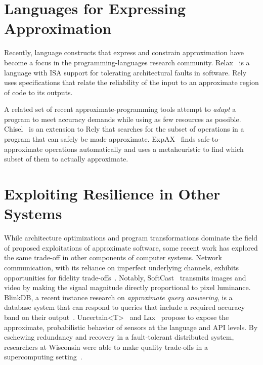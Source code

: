 \section{Languages for Expressing Approximation}

Recently, language constructs that express and constrain
approximation have become a focus in the programming-languages research
community.
Relax~\cite{relax} is a language with ISA support for tolerating architectural
faults in software.
Rely~\cite{rely} uses specifications that relate the reliability of the input
to an approximate region of code to its outputs.

A related set of recent approximate-programming tools attempt to \emph{adapt}
a program to meet accuracy demands while using as few resources as possible.
Chisel~\cite{chisel} is an extension to Rely that searches for the subset of
operations in a program that can safely be made approximate.
ExpAX~\cite{expax-tr} finds safe-to-approximate operations automatically and
uses a metaheuristic to find which subset of them to actually approximate.




\section{Exploiting Resilience in Other Systems}

While architecture optimizations and program transformations dominate the
field of proposed exploitations of approximate software, some recent work has
explored the same trade-off in other components of computer systems. Network
communication, with its reliance on imperfect underlying channels, exhibits
opportunities for fidelity trade-offs~\cite{softcast, luo-globecom, apex,
smpmup2006}. Notably, SoftCast~\cite{softcast} transmits images and video by
making the signal magnitude directly proportional to pixel luminance. BlinkDB,
a recent instance research on \emph{approximate query answering},
is a database system that can respond to queries that include a required
accuracy band on their output~\cite{blinkdb}.
Uncertain{\textless}T{\textgreater}~\cite{uncertaint} and Lax~\cite{lax}
propose to expose the approximate, probabilistic behavior of sensors at the
language and API levels.
By eschewing redundancy and
recovery in a fault-tolerant distributed system, researchers at Wisconsin were
able to make quality trade-offs in a supercomputing
setting~\cite{dekruijf-icpp}.


